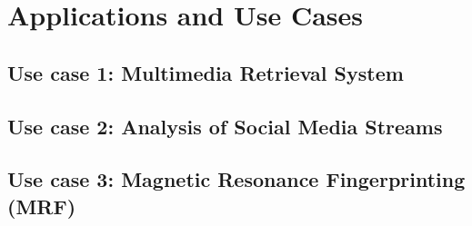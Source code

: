 \chapter{Applications and Use Cases}
\section{Use case 1: Multimedia Retrieval System}

\section{Use case 2: Analysis of Social Media Streams}

\section{Use case 3: Magnetic Resonance Fingerprinting (MRF)}